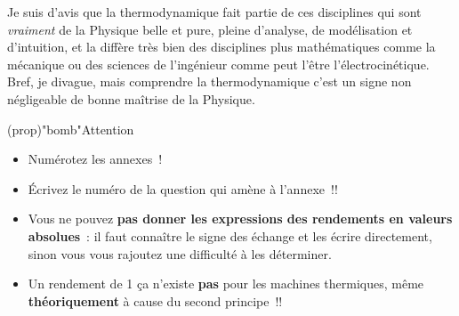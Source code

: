 \documentclass[a4paper, 11pt, final, garamond]{book}
\begin{document}
Je suis d'avis que la thermodynamique fait partie de ces disciplines qui sont
\textit{vraiment} de la Physique belle et pure, pleine d'analyse, de
modélisation et d'intuition, et la diffère très bien des disciplines plus
mathématiques comme la mécanique ou des sciences de l'ingénieur comme peut
l'être l'électrocinétique. Bref, je divague, mais comprendre la thermodynamique
c'est un signe non négligeable de bonne maîtrise de la
Physique.

\begin{tcn}(prop)"bomb"{Attention}
	\begin{itemize}
		\item Numérotez les annexes~!
		\item Écrivez le numéro de la question qui amène à
		      l'annexe~!!
		\item Vous ne pouvez \textbf{pas donner les expressions des rendements
			      en valeurs absolues}~: il faut connaître le signe des échange et les
		      écrire directement, sinon vous vous rajoutez une difficulté à les
		      déterminer.
		\item Un rendement de 1 ça n'existe \textbf{pas} pour les machines
		      thermiques, même \textbf{théoriquement} à cause du second principe~!!
	\end{itemize}
\end{tcn}

\setcounter{section}{0}
\end{document}
